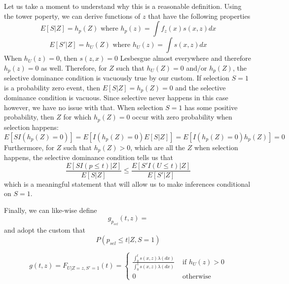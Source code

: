 \documentclass{article}
\begin{document}
\begin{appendix}
Let us take a moment to understand why this is a reasonable definition. Using the tower poperty, we can derive functions of $z$ that have the following properties 
\begin{equation*}
  E[S | Z] = h_p(Z) \text{ where } h_p(z) = \int f_z(x) s(x, z) dx
 \end{equation*}
\begin{equation*}
 E[S' | Z] = h_U(Z) \text{ where } h_U(z) = \int s(x, z) dx
\end{equation*}
When $h_U(z) =0$, then $s(z, x) = 0$ Lesbesgue almost everywhere and therefore $h_p(z) =0$ as well. Therefore, for $Z$ such that $h_U(Z) = 0$ and/or $h_p(Z)$, the selective dominance condition is vacuously true by our custom. If selection $S=1$ is a probability zero event, then $E[S |Z] = h_p(Z) = 0$ and the selective dominance condition is vacuous. Since selective never happens in this case however, we have no issue with that. When selection $S=1$ has some positive probability, then $Z$ for which $h_p(Z) = 0$ occur with zero probability when selection happens:
\begin{equation*}
    E[ S I(h_p(Z) = 0 ) ] = E[I(h_p(Z)= 0)E[S|Z]] = E[I(h_p(Z) =0)h_p(Z)] = 0
\end{equation*}
Furthermore, for $Z$ such that $h_p(Z) > 0$, which are all the $Z$ when selection happens, the selective dominance condition tells us that
\begin{equation*}
    \frac{E[S I(p \leq t) | Z]}{E[S | Z]} \leq \frac{E[S' I(U \leq t) | Z]}{E[S'| Z]}
\end{equation*}
which is a meaningful statement that will allow us to make inferences conditional on $S=1$. 


Finally, we can like-wise define 
\begin{equation*}
    g_{p_{sel}}(t, z) = 
\end{equation*}
and adopt the custom that 
\begin{equation*}
    P(p_{sel} \leq t | Z, S=1)
\end{equation*}

\iffalse
\begin{equation*}
    g(t, z) = F_{U |Z=z, S'=1}(t) = \begin{cases}
        \frac{\int_0^t s(x, z) \lambda(dx)}{\int_0^1 s(x, z) \lambda(dx)} & \text{ if } h_U(z) > 0\\
        0 & \text{ otherwise}
    \end{cases}
\end{equation*}



\end{appendix}
\end{document}
